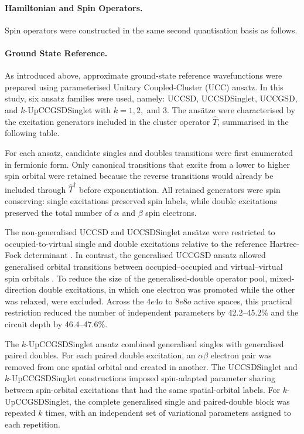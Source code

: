 
\paragraph{Hamiltonian and Spin Operators.}


Spin operators were constructed in the same second quantisation basis as follows.

\SpinZEquation
\SpinLadderOperatorsEquation
\SpinSquaredEquation



\paragraph{Ground State Reference.}
As introduced above, approximate ground-state reference wavefunctions were prepared using parameterised Unitary Coupled-Cluster (UCC) ansatz. 
In this study, six ansatz families were used, namely: UCCSD, UCCSDSinglet, UCCGSD, and \(k\)-UpCCGSDSinglet with \(k=1,2,\) and \(3\). The ansätze were characterised by the excitation generators included in the cluster operator $\hat{T}$, summarised in the following table.



For each ansatz, candidate singles and doubles transitions were first enumerated in fermionic form. Only canonical transitions that excite from a lower to higher spin orbital were retained because the reverse transitions would already be included through $\hat{T}^{\dagger}$ before exponentiation. All retained generators were spin conserving: single excitations preserved spin labels, while double excitations preserved the total number of $\alpha$ and $\beta$ spin electrons. 

The non-generalised UCCSD and UCCSDSinglet ansätze were restricted to occupied-to-virtual single and double excitations relative to the reference Hartree-Fock determinant \cite{Anand2022UCCReview}. In contrast, the generalised UCCGSD ansatz allowed generalised orbital transitions between occupied--occupied and virtual--virtual spin orbitals \cite{Lee2018GeneralisedAnsatzOriginal, Diniz2021GeneralisedAnsatzAdaptations}.
To reduce the size of the generalised-double operator pool, mixed-direction double excitations, in which one electron was promoted while the other was relaxed, were excluded. Across the $4e4o$ to $8e8o$ active spaces, this practical restriction reduced the number of independent parameters by 42.2--45.2\% and the circuit depth by 46.4--47.6\%.

The $k$-UpCCGSDSinglet ansatz combined generalised singles with generalised paired doubles. For each paired double excitation, an $\alpha\beta$ electron pair was removed from one spatial orbital and created in another. 
The UCCSDSinglet and $k$-UpCCGSDSinglet constructions imposed spin-adapted parameter sharing between spin-orbital excitations that had the same spatial-orbital labels. 
For $k$-UpCCGSDSinglet, the complete generalised single and paired-double block was repeated $k$ times, with an independent set of variational parameters assigned to each repetition. 

